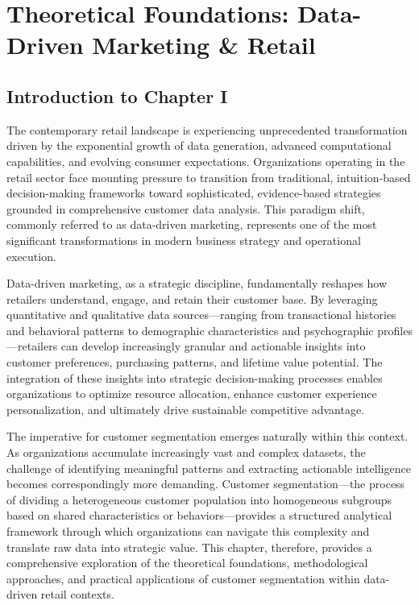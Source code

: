\documentclass[12pt,a4paper,oneside]{report}
\begin{document}

\chapter{Theoretical Foundations: Data-Driven Marketing \& Retail}


\section*{Introduction to Chapter I}

The contemporary retail landscape is experiencing unprecedented transformation driven by the exponential growth of data generation, advanced computational capabilities, and evolving consumer expectations. Organizations operating in the retail sector face mounting pressure to transition from traditional, intuition-based decision-making frameworks toward sophisticated, evidence-based strategies grounded in comprehensive customer data analysis. This paradigm shift, commonly referred to as data-driven marketing, represents one of the most significant transformations in modern business strategy and operational execution.

Data-driven marketing, as a strategic discipline, fundamentally reshapes how retailers understand, engage, and retain their customer base. By leveraging quantitative and qualitative data sources—ranging from transactional histories and behavioral patterns to demographic characteristics and psychographic profiles—retailers can develop increasingly granular and actionable insights into customer preferences, purchasing patterns, and lifetime value potential. The integration of these insights into strategic decision-making processes enables organizations to optimize resource allocation, enhance customer experience personalization, and ultimately drive sustainable competitive advantage.

The imperative for customer segmentation emerges naturally within this context. As organizations accumulate increasingly vast and complex datasets, the challenge of identifying meaningful patterns and extracting actionable intelligence becomes correspondingly more demanding. Customer segmentation—the process of dividing a heterogeneous customer population into homogeneous subgroups based on shared characteristics or behaviors—provides a structured analytical framework through which organizations can navigate this complexity and translate raw data into strategic value. This chapter, therefore, provides a comprehensive exploration of the theoretical foundations, methodological approaches, and practical applications of customer segmentation within data-driven retail contexts.
\end{document}
